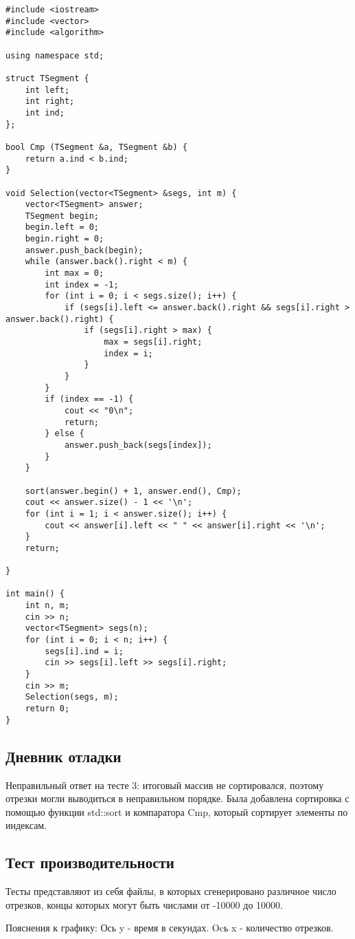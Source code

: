 \documentclass[12pt]{article}
\begin{document}
\begin{verbatim}
#include <iostream>
#include <vector>
#include <algorithm>

using namespace std;

struct TSegment {
	int left;
	int right;
	int ind;	
};

bool Cmp (TSegment &a, TSegment &b) {
	return a.ind < b.ind;
}

void Selection(vector<TSegment> &segs, int m) {
	vector<TSegment> answer;
	TSegment begin;
	begin.left = 0;
	begin.right = 0;
	answer.push_back(begin);
	while (answer.back().right < m) {
		int max = 0;
		int index = -1;
		for (int i = 0; i < segs.size(); i++) {
			if (segs[i].left <= answer.back().right && segs[i].right > answer.back().right) {
				if (segs[i].right > max) {
					max = segs[i].right;
					index = i;
				}
			}
		}
		if (index == -1) {
			cout << "0\n";
			return;
		} else {
			answer.push_back(segs[index]);
		}
	}

	sort(answer.begin() + 1, answer.end(), Cmp);
	cout << answer.size() - 1 << '\n';
	for (int i = 1; i < answer.size(); i++) {
		cout << answer[i].left << " " << answer[i].right << '\n';
	}
	return;

}

int main() {
	int n, m;
	cin >> n;
	vector<TSegment> segs(n);
	for (int i = 0; i < n; i++) {
		segs[i].ind = i;
		cin >> segs[i].left >> segs[i].right; 
	}
	cin >> m;
	Selection(segs, m);
	return 0;
}
\end{verbatim}

\subsection*{Дневник отладки}

Неправильный ответ на тесте 3: итоговый массив не сортировался, поэтому отрезки могли выводиться в неправильном порядке. Была добавлена сортировка с помощью функции std::sort и компаратора Cmp, который сортирует элементы по индексам.

\subsection*{Тест производительности}

Тесты представляют из себя файлы, в которых сгенерировано различное число отрезков, концы которых могут быть числами от -10000 до 10000.

\newline
Пояснения к графику:
Ось y - время в секундах. Ocь x - количество отрезков.
\end{document}
